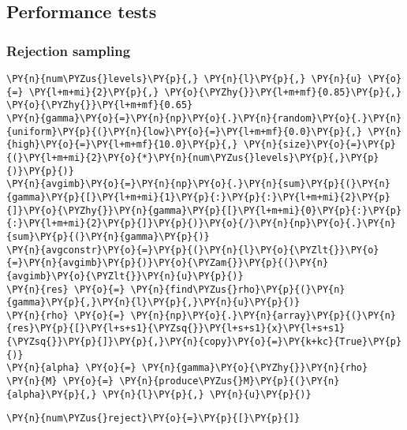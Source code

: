 \documentclass[10pt, article,table]{article}
\begin{document}
\subsection{Performance tests}\label{sec.performance_tests}

\subsubsection{Rejection sampling}
    \begin{tcolorbox}[breakable, size=fbox, boxrule=1pt, pad at break*=1mm,colback=cellbackground, colframe=cellborder]
\begin{Verbatim}[commandchars=\\\{\}]
\PY{n}{num\PYZus{}levels}\PY{p}{,} \PY{n}{l}\PY{p}{,} \PY{n}{u} \PY{o}{=} \PY{l+m+mi}{2}\PY{p}{,} \PY{o}{\PYZhy{}}\PY{l+m+mf}{0.85}\PY{p}{,} \PY{o}{\PYZhy{}}\PY{l+m+mf}{0.65}
\PY{n}{gamma}\PY{o}{=}\PY{n}{np}\PY{o}{.}\PY{n}{random}\PY{o}{.}\PY{n}{uniform}\PY{p}{(}\PY{n}{low}\PY{o}{=}\PY{l+m+mf}{0.0}\PY{p}{,} \PY{n}{high}\PY{o}{=}\PY{l+m+mf}{10.0}\PY{p}{,} \PY{n}{size}\PY{o}{=}\PY{p}{(}\PY{l+m+mi}{2}\PY{o}{*}\PY{n}{num\PYZus{}levels}\PY{p}{,}\PY{p}{)}\PY{p}{)}
\PY{n}{avgimb}\PY{o}{=}\PY{n}{np}\PY{o}{.}\PY{n}{sum}\PY{p}{(}\PY{n}{gamma}\PY{p}{[}\PY{l+m+mi}{1}\PY{p}{:}\PY{p}{:}\PY{l+m+mi}{2}\PY{p}{]}\PY{o}{\PYZhy{}}\PY{n}{gamma}\PY{p}{[}\PY{l+m+mi}{0}\PY{p}{:}\PY{p}{:}\PY{l+m+mi}{2}\PY{p}{]}\PY{p}{)}\PY{o}{/}\PY{n}{np}\PY{o}{.}\PY{n}{sum}\PY{p}{(}\PY{n}{gamma}\PY{p}{)}
\PY{n}{avgconstr}\PY{o}{=}\PY{p}{(}\PY{n}{l}\PY{o}{\PYZlt{}}\PY{o}{=}\PY{n}{avgimb}\PY{p}{)}\PY{o}{\PYZam{}}\PY{p}{(}\PY{n}{avgimb}\PY{o}{\PYZlt{}}\PY{n}{u}\PY{p}{)}
\PY{n}{res} \PY{o}{=} \PY{n}{find\PYZus{}rho}\PY{p}{(}\PY{n}{gamma}\PY{p}{,}\PY{n}{l}\PY{p}{,}\PY{n}{u}\PY{p}{)}
\PY{n}{rho} \PY{o}{=} \PY{n}{np}\PY{o}{.}\PY{n}{array}\PY{p}{(}\PY{n}{res}\PY{p}{[}\PY{l+s+s1}{\PYZsq{}}\PY{l+s+s1}{x}\PY{l+s+s1}{\PYZsq{}}\PY{p}{]}\PY{p}{,}\PY{n}{copy}\PY{o}{=}\PY{k+kc}{True}\PY{p}{)}
\PY{n}{alpha} \PY{o}{=} \PY{n}{gamma}\PY{o}{\PYZhy{}}\PY{n}{rho}
\PY{n}{M} \PY{o}{=} \PY{n}{produce\PYZus{}M}\PY{p}{(}\PY{n}{alpha}\PY{p}{,} \PY{n}{l}\PY{p}{,} \PY{n}{u}\PY{p}{)}
\end{Verbatim}
\end{tcolorbox}

\begin{tcolorbox}[breakable, size=fbox, boxrule=1pt, pad at break*=1mm,colback=cellbackground, colframe=cellborder]
\begin{Verbatim}[commandchars=\\\{\}]
\PY{n}{num\PYZus{}reject}\PY{o}{=}\PY{p}{[}\PY{p}{]}
\end{Verbatim}
\end{tcolorbox}
\end{document}
